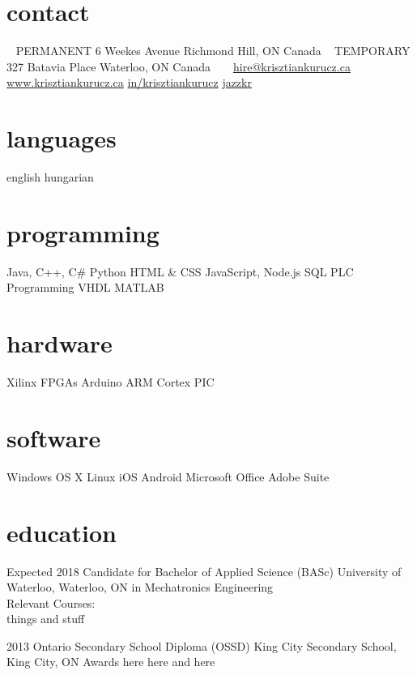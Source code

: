 \documentclass[hidelinks]{kkurucz-cv}
\begin{document}


\begin{aside} %
\section{contact}
~
{\headingfont PERMANENT}
6 Weekes Avenue
Richmond Hill, ON
Canada
~
{\headingfont TEMPORARY}
327 Batavia Place
Waterloo, ON
Canada
~
~
\mail\href{mailto:hire@krisztiankurucz.ca}{ hire@krisztiankurucz.ca}
\website\href{http://www.krisztiankurucz.ca}{ www.krisztiankurucz.ca}
\linkedin\href{http://ca.linkedin.com/in/krisztiankurucz}{ in/krisztiankurucz}
\github\href{http://www.github.com/jazzkr}{ jazzkr}
\section{languages}
english 
hungarian
\section{programming}
Java, C++, C\#
Python
HTML \& CSS
JavaScript, Node.js
SQL
PLC Programming
VHDL
MATLAB
\section{hardware}
Xilinx FPGAs
Arduino
ARM Cortex
PIC
\section{software}
Windows
OS X
Linux
iOS
Android
Microsoft Office
Adobe Suite
\end{aside}


\section{education}

\begin{entrylist}
\entry
{Expected 2018}
{Candidate for Bachelor of Applied Science (BASc)}
{University of Waterloo, Waterloo, ON}
{{\headingfont in Mechatronics Engineering}}
{\\Relevant Courses:\\
things and stuff}

\entry
{2013}
{Ontario Secondary School Diploma (OSSD)}
{King City Secondary School, King City, ON}
{Awards here here and here}
{\null}
\end{entrylist}
\end{document}
